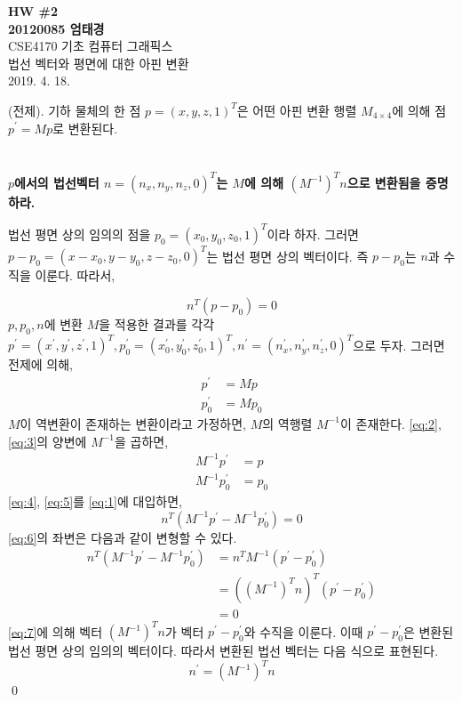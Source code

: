 \documentclass{article}
\begin{document}
\noindent
\large\textbf{HW \#2} \\
\textbf{20120085 엄태경} \\
\normalsize CSE4170 기초 컴퓨터 그래픽스\\
법선 벡터와 평면에 대한 아핀 변환\\
2019. 4. 18.

\par\bigskip\bigskip
(전제). 기하 물체의 한 점 $p = (x, y, z, 1)^T$은 어떤 아핀 변환 행렬 $M_{4\times4}$에 의해 점 $p^\prime = Mp$로 변환된다.

\section{}
\textbf{$p$에서의 법선벡터 $n = (n_x, n_y, n_z, 0)^T$는 $M$에 의해 $(M^{-1})^T n$으로 변환됨을 증명하라.}
\begin{solution}
\begin{sloppypar}
법선 평면 상의 임의의 점을 $p_0 = (x_0, y_0, z_0, 1)^T$이라 하자. 그러면 $p-p_0 = {(x-x_0, y-y_0, z-z_0, 0)^T}$는 법선 평면 상의 벡터이다. 즉 $p-p_0$는 $n$과 수직을 이룬다. 따라서,
\end{sloppypar}
\begin{equation}
	n^T (p-p_0) = 0 \label{eq:1}
\end{equation}
$p, p_0, n$에 변환 $M$을 적용한 결과를 각각 $p^\prime = (x^\prime, y^\prime, z^\prime, 1)^T, p_0^\prime=(x_0^\prime, y_0^\prime, z_0^\prime, 1)^T, n^\prime=(n_x^\prime, n_y^\prime, n_z^\prime, 0)^T$으로 두자. 그러면 전제에 의해,
\begin{align}
	p^\prime &= Mp \label{eq:2} \\
	p_0^\prime &= Mp_0 \label{eq:3}
\end{align}
$M$이 역변환이 존재하는 변환이라고 가정하면, $M$의 역행렬 $M^{-1}$이 존재한다. \eqref{eq:2}, \eqref{eq:3}의 양변에 $M^{-1}$을 곱하면,
\begin{align}
	M^{-1}p^\prime &= p \label{eq:4} \\
	M^{-1}p_0^\prime &= p_0 \label{eq:5}
\end{align}
\eqref{eq:4}, \eqref{eq:5}를 \eqref{eq:1}에 대입하면,
\begin{equation}
	n^T(M^{-1}p^\prime - M^{-1}p_0^\prime)=0 \label{eq:6}
\end{equation}
\eqref{eq:6}의 좌변은 다음과 같이 변형할 수 있다.
\begin{equation}
	\begin{aligned}
		n^T(M^{-1}p^\prime - M^{-1}p_0^\prime) &= n^T M^{-1} (p^\prime - p_0 ^\prime) \\
		&= ((M^{-1})^T n)^T (p^\prime - p_0 ^\prime)\\
		&= 0
	\end{aligned} \label{eq:7}
\end{equation}
\eqref{eq:7}에 의해 벡터 $(M^{-1})^T n$가 벡터 $p^\prime-p_0^\prime$와 수직을 이룬다. 이때 $p^\prime-p_0^\prime$은 변환된 법선 평면 상의 임의의 벡터이다. 따라서 변환된 법선 벡터는 다음 식으로 표현된다.
\begin{equation}
	n^\prime = (M^{-1})^T n \label{eq:8}
\end{equation}\qed
\end{solution}
\end{document}

